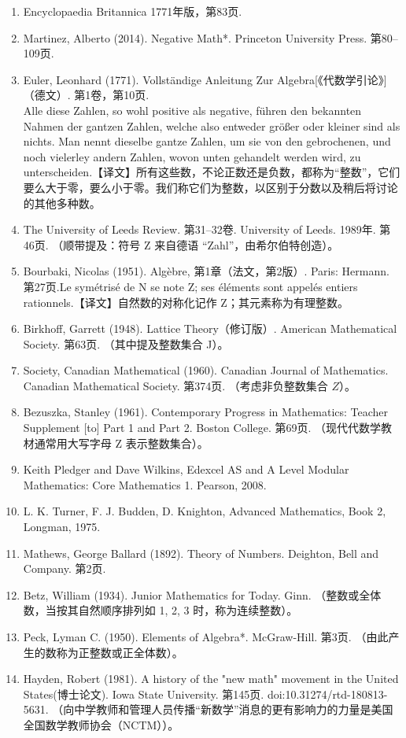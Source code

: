 \begin{enumerate}
\item Encyclopaedia Britannica 1771年版，第83页.
\item Martinez, Alberto (2014). Negative Math*. Princeton University Press. 第80–109页.
\item Euler, Leonhard (1771). Vollständige Anleitung Zur Algebra[《代数学引论》]（德文）. 第1卷，第10页.\\
Alle diese Zahlen, so wohl positive als negative, führen den bekannten Nahmen der gantzen Zahlen, welche also entweder größer oder kleiner sind als nichts. Man nennt dieselbe gantze Zahlen, um sie von den gebrochenen, und noch vielerley andern Zahlen, wovon unten gehandelt werden wird, zu unterscheiden.【译文】所有这些数，不论正数还是负数，都称为“整数”，它们要么大于零，要么小于零。我们称它们为整数，以区别于分数以及稍后将讨论的其他多种数。
\item The University of Leeds Review. 第31–32卷. University of Leeds. 1989年. 第46页. （顺带提及：符号 Z 来自德语 “Zahl”，由希尔伯特创造）。
\item Bourbaki, Nicolas (1951). Algèbre, 第1章（法文，第2版）. Paris: Hermann. 第27页.Le symétrisé de N se note Z; ses éléments sont appelés entiers rationnels.【译文】自然数的对称化记作 Z；其元素称为有理整数。
\item Birkhoff, Garrett (1948). Lattice Theory（修订版）. American Mathematical Society. 第63页. （其中提及整数集合 J）。
\item Society, Canadian Mathematical (1960). Canadian Journal of Mathematics. Canadian Mathematical Society. 第374页. （考虑非负整数集合 $Z$）。
\item Bezuszka, Stanley (1961). Contemporary Progress in Mathematics: Teacher Supplement [to] Part 1 and Part 2. Boston College. 第69页. （现代代数学教材通常用大写字母 Z 表示整数集合）。
\item Keith Pledger and Dave Wilkins, Edexcel AS and A Level Modular Mathematics: Core Mathematics 1. Pearson, 2008.
\item L. K. Turner, F. J. Budden, D. Knighton, Advanced Mathematics, Book 2, Longman, 1975.
\item  Mathews, George Ballard (1892). Theory of Numbers. Deighton, Bell and Company. 第2页.
\item Betz, William (1934). Junior Mathematics for Today. Ginn. （整数或全体数，当按其自然顺序排列如 1, 2, 3 时，称为连续整数）。
\item Peck, Lyman C. (1950). Elements of Algebra*. McGraw-Hill. 第3页. （由此产生的数称为正整数或正全体数）。
\item Hayden, Robert (1981). A history of the "new math" movement in the United States(博士论文). Iowa State University. 第145页. doi:10.31274/rtd-180813-5631. （向中学教师和管理人员传播“新数学”消息的更有影响力的力量是美国全国数学教师协会（NCTM））。

\end{enumerate}
